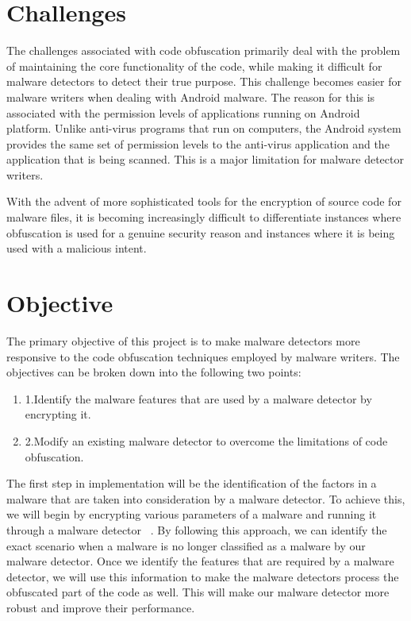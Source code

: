\section{Challenges}

The challenges associated with code obfuscation primarily deal with the problem of maintaining the core functionality of the code, while making it  difficult for malware detectors to detect their true purpose. This challenge becomes easier for malware writers when dealing with Android malware. The reason for this is associated with the permission levels of applications running on Android platform. Unlike anti-virus programs that run on computers, the Android system provides the same set of permission levels to the anti-virus application and the application that is being scanned. This is a major limitation for malware detector writers.

With the advent of more sophisticated tools for the encryption of source code for malware files, it is becoming increasingly difficult to differentiate instances where obfuscation is used for a genuine security reason and instances where it is being used with a malicious intent.

\section{Objective}

The primary objective of this project is to make malware detectors more responsive to the code obfuscation techniques employed by malware writers. The objectives can be broken down into the following two points:
\begin{enumerate}
	\item 1.Identify the malware features that are used by a malware detector by encrypting it.
	\item 2.Modify an existing malware detector to overcome the limitations of code obfuscation.
\end{enumerate}

The first step in implementation will be the identification of the factors in a malware that are taken into consideration by a malware detector. To achieve this, we will begin by encrypting various parameters of a malware and running it through a malware detector ~\cite{gordon}. By following this approach, we can identify the exact scenario when a malware is no longer classified as a malware by our malware detector. Once we identify the features that are required by a malware detector, we will use this information to make the malware detectors process the obfuscated part of the code as well. This will make our malware detector more robust and improve their performance.